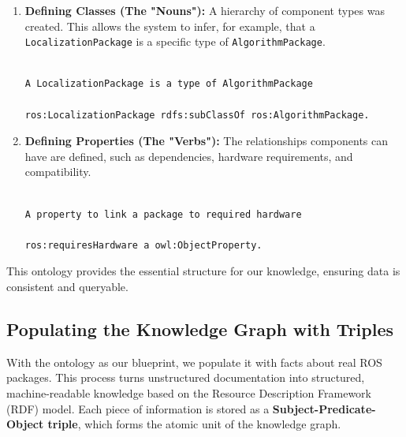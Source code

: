\documentclass[rnd]{mas_proposal}
\begin{document}
\begin{tcolorbox}[colback=blue!5!white,colframe=blue!75!black,title=Key Ontology Constructs]
\begin{enumerate}
\item \textbf{Defining Classes (The "Nouns"):} A hierarchy of component types was created. This allows the system to infer, for example, that a \texttt{LocalizationPackage} is a specific type of \texttt{AlgorithmPackage}.
\begin{lstlisting}[language=bash]

A LocalizationPackage is a type of AlgorithmPackage

ros:LocalizationPackage rdfs:subClassOf ros:AlgorithmPackage.
\end{lstlisting}

\item \textbf{Defining Properties (The "Verbs"):} The relationships components can have are defined, such as dependencies, hardware requirements, and compatibility.

\begin{lstlisting}[language=bash]

A property to link a package to required hardware

ros:requiresHardware a owl:ObjectProperty.
\end{lstlisting}
\end{enumerate}
\end{tcolorbox}
This ontology provides the essential structure for our knowledge, ensuring data is consistent and queryable.

\subsection{Populating the Knowledge Graph with Triples}
With the ontology as our blueprint, we populate it with facts about real ROS packages. This process turns unstructured documentation into structured, machine-readable knowledge based on the Resource Description Framework (RDF) model. Each piece of information is stored as a \textbf{Subject-Predicate-Object triple}, which forms the atomic unit of the knowledge graph.
\end{document}
